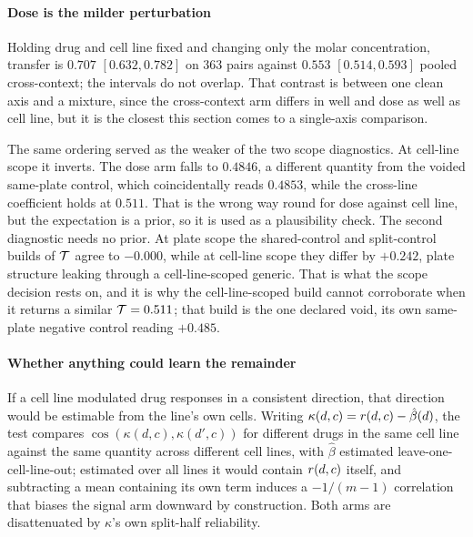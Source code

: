 \paragraph{Dose is the milder perturbation} Holding drug and cell line fixed and
changing only the molar concentration, transfer is $0.707$ $[0.632, 0.782]$ on
$\num{363}$ pairs against $0.553$ $[0.514, 0.593]$ pooled cross-context; the
intervals do not overlap. That contrast is between one clean axis and a mixture,
since the cross-context arm differs in well and dose as well as cell line, but it
is the closest this section comes to a single-axis comparison.

The same ordering served as the weaker of the two scope diagnostics. At cell-line
scope it inverts. The dose arm falls to $0.4846$, a different quantity from the
voided same-plate control, which coincidentally reads $0.4853$, while the
cross-line coefficient holds at $0.511$. That is the wrong way round for dose
against cell line, but the expectation is a prior, so it is used as a
plausibility check. The second diagnostic needs no prior. At plate scope the
shared-control and split-control builds of $\mathcal{T}$ agree to $-0.000$, while at
cell-line scope they differ by $+0.242$, plate structure leaking through a
cell-line-scoped generic. That is what the scope decision rests on, and it is why
the cell-line-scoped build cannot corroborate when it returns a similar
$\mathcal{T} = 0.511$; that build is the one declared void, its own same-plate
negative control reading $+0.485$.

\paragraph{Whether anything could learn the remainder} If a cell line modulated
drug responses in a consistent direction, that direction would be estimable from
the line's own cells. Writing $\kappa(d,c) = r(d,c) - \hat{\beta}(d)$, the
test compares $\cos(\kappa(d,c), \kappa(d',c))$ for different drugs in the same
cell line against the same quantity across different cell lines, with
$\hat{\beta}$ estimated leave-one-cell-line-out; estimated over all lines it
would contain $r(d,c)$ itself, and subtracting a mean containing its own
term induces a $-1/(m-1)$ correlation that biases the signal arm downward by
construction. Both arms are disattenuated by $\kappa$'s own split-half
reliability.


